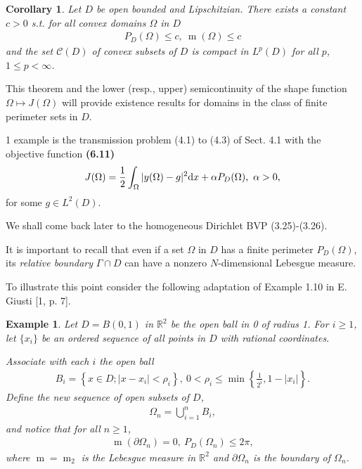\documentclass{book}
\numberwithin{equation}{section}
\newtheorem{corollary}{Corollary}[section]
\newtheorem{example}{Example}[section]
\begin{document}
\begin{enumerate}
    \begin{corollary}
        Let $D$ be open bounded and Lipschitzian. There exists a constant $c > 0$ s.t. for all convex domains $\Omega$ in $D$
        \begin{align*}
            P_D(\Omega)\le c,\ \operatorname{m}(\Omega)\le c
        \end{align*}
        and the set $\mathcal{C}(D)$ of convex subsets of $D$ is compact in $L^p(D)$ for all $p$, $1\le p < \infty$.
    \end{corollary}
    This theorem and the lower (resp., upper) semicontinuity of the shape function $\Omega\mapsto J(\Omega)$ will provide existence results for domains in the class of finite perimeter sets in $D$.
    
    1 example is the transmission problem (4.1) to (4.3) of Sect. 4.1 with the objective function \textbf{(6.11)}
    \begin{align*}
        J(\Omega) = \frac{1}{2}\int_\Omega |y(\Omega) - g|^2{\rm d}x + \alpha P_D(\Omega),\ \alpha > 0,
    \end{align*}
    for some $g\in L^2(D)$.
    
    We shall come back later to the homogeneous Dirichlet BVP (3.25)-(3.26).
    
    It is important to recall that even if a set $\Omega$ in $D$ has a finite perimeter $P_D(\Omega)$, its \textit{relative boundary} $\Gamma\cap D$ can have a nonzero $N$-dimensional Lebesgue measure.
    
    To illustrate this point consider the following adaptation of Example 1.10 in E. Giusti [1, p. 7].
    
    \begin{example}
        Let $D = B(0,1)$ in $\mathbb{R}^2$ be the open ball in 0 of radius 1. For $i\ge 1$, let $\{x_i\}$ be an ordered sequence of all points in $D$ with rational coordinates.
        
        Associate with each $i$ the open ball
        \begin{align*}
            B_i = \left\{x\in D;|x - x_i| < \rho_i\right\},\ 0 < \rho_i\le\min\left\{\frac{1}{2^i},1 - |x_i|\right\}.
        \end{align*}
        Define the new sequence of open subsets of $D$,
        \begin{align*}
            \Omega_n = \bigcup_{i=1}^n B_i,
        \end{align*}
        and notice that for all $n\ge 1$,
        \begin{align*}
            \operatorname{m}(\partial\Omega_n) = 0,\ P_D(\Omega_n)\le 2\pi,
        \end{align*}
        where $\operatorname{m} = \operatorname{m}_2$ is the Lebesgue measure in $\mathbb{R}^2$ and $\partial\Omega_n$ is the boundary of $\Omega_n$.
        

\end{example}
\end{enumerate}
\end{document}
